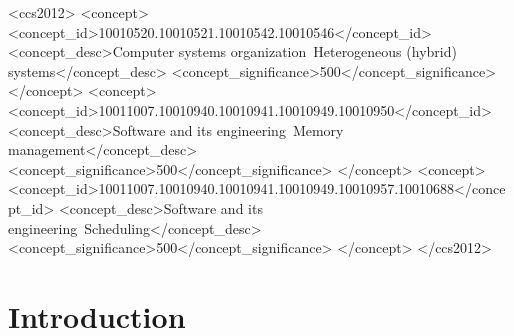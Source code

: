 \documentclass[sigplan,anonymous,review,nonacm]{acmart}
\begin{document}
\begin{CCSXML}
<ccs2012>
   <concept>
       <concept_id>10010520.10010521.10010542.10010546</concept_id>
       <concept_desc>Computer systems organization~Heterogeneous (hybrid) systems</concept_desc>
       <concept_significance>500</concept_significance>
       </concept>
   <concept>
       <concept_id>10011007.10010940.10010941.10010949.10010950</concept_id>
       <concept_desc>Software and its engineering~Memory management</concept_desc>
       <concept_significance>500</concept_significance>
       </concept>
   <concept>
       <concept_id>10011007.10010940.10010941.10010949.10010957.10010688</concept_id>
       <concept_desc>Software and its engineering~Scheduling</concept_desc>
       <concept_significance>500</concept_significance>
       </concept>
 </ccs2012>
\end{CCSXML}




\maketitle

\section{Introduction}
\label{sec:introduction}
\end{document}
